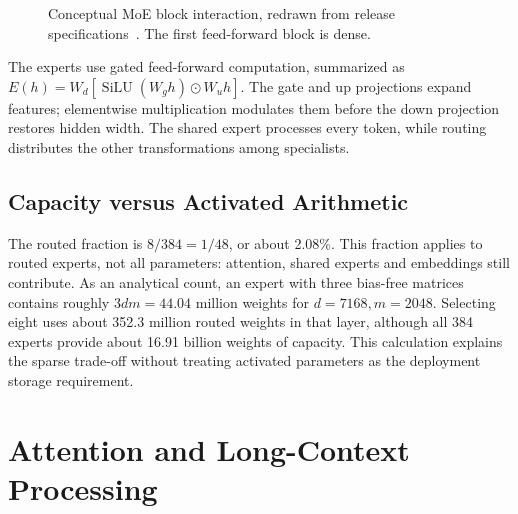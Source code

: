 \documentclass[conference]{IEEEtran}
\begin{document}
\begin{figure}[t]
\centering\small
{}
\caption{Conceptual MoE block interaction, redrawn from release specifications~\cite{repo,config}. The first feed-forward block is dense.}
\end{figure}

The experts use gated feed-forward computation, summarized as $E(h)=W_d[\operatorname{SiLU}(W_gh)\odot W_uh]$. The gate and up projections expand features; elementwise multiplication modulates them before the down projection restores hidden width. The shared expert processes every token, while routing distributes the other transformations among specialists.

\subsection{Capacity versus Activated Arithmetic}
The routed fraction is $8/384=1/48$, or about 2.08\%. This fraction applies to routed experts, not all parameters: attention, shared experts and embeddings still contribute. As an analytical count, an expert with three bias-free matrices contains roughly $3dm=44.04$ million weights for $d=7168,m=2048$. Selecting eight uses about 352.3 million routed weights in that layer, although all 384 experts provide about 16.91 billion weights of capacity. This calculation explains the sparse trade-off without treating activated parameters as the deployment storage requirement.

\section{Attention and Long-Context Processing}
\end{document}
